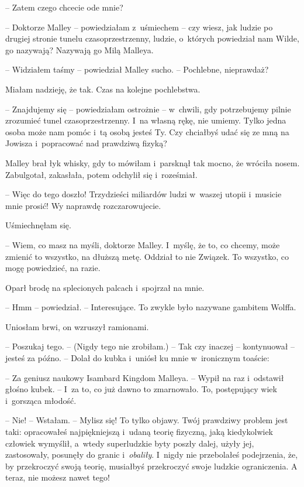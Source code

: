 \documentclass[oneside,polish,11pt,sfheadings]{mwbk}
\begin{document}
-- Zatem czego chcecie ode mnie?

-- Doktorze Malley -- powiedziałam z~uśmiechem -- czy wiesz, jak ludzie po
drugiej stronie tunelu czasoprzestrzenny, ludzie, o~których powiedział
nam Wilde, go nazywają? Nazywają go Milą Malleya.

-- Widziałem taśmy -- powiedział Malley sucho. -- Pochlebne, nieprawdaż?

Miałam nadzieję, że tak. Czas na kolejne pochlebstwa.

-- Znajdujemy się -- powiedziałam ostrożnie -- w~chwili, gdy potrzebujemy
pilnie zrozumieć tunel czasoprzestrzenny. I~na własną rękę, nie umiemy.
Tylko jedna osoba może nam pomóc i~tą osobą jesteś Ty. Czy chciałbyś
udać się ze mną na Jowisza i~popracować nad prawdziwą fizyką?

Malley brał łyk whisky, gdy to mówiłam i~parsknął tak mocno, że wróciła
nosem. Zabulgotał, zakasłała, potem odchylił się i~roześmiał.

-- Więc do tego doszło! Trzydzieści miliardów ludzi w~waszej utopii i~musicie mnie prosić! Wy naprawdę rozczarowujecie.

Uśmiechnęłam się. 

-- Wiem, co masz na myśli, doktorze Malley. I~myślę, że
to, co chcemy, może zmienić to wszystko, na dłuższą metę. Oddział to nie
Związek. To wszystko, co mogę powiedzieć, na razie.

Oparł brodę na splecionych palcach i~spojrzał na mnie.

-- Hmm -- powiedział. -- Interesujące. To zwykle było nazywane gambitem
Wolffa.

Uniosłam brwi, on wzruszył ramionami. 

-- Poszukaj tego. -- (Nigdy tego nie
zrobiłam.) -- Tak czy inaczej -- kontynuował -- jesteś za późno. -- Dolał do
kubka i~uniósł ku mnie w~ironicznym toaście:

-- Za geniusz naukowy Isambard Kingdom Malleya. -- Wypił na raz i~odstawił
głośno kubek. -- I~za to, co już dawno to zmarnowało. To, postępujący
wiek i~gorsząca młodość.

-- Nie! -- Wstałam. -- Mylisz się! To tylko objawy. Twój prawdziwy problem
jest taki: opracowałeś najpiękniejszą i~udaną teorię fizyczną, jaką
kiedykolwiek człowiek wymyślił, a~wtedy superludzkie byty poszły dalej,
użyły jej, zastosowały, posunęły do granic i~\textit{obaliły}. I~nigdy nie
przebolałeś podejrzenia, że, by przekroczyć swoją teorię, musiałbyś
przekroczyć swoje ludzkie ograniczenia. A teraz, nie możesz nawet tego!
\end{document}
